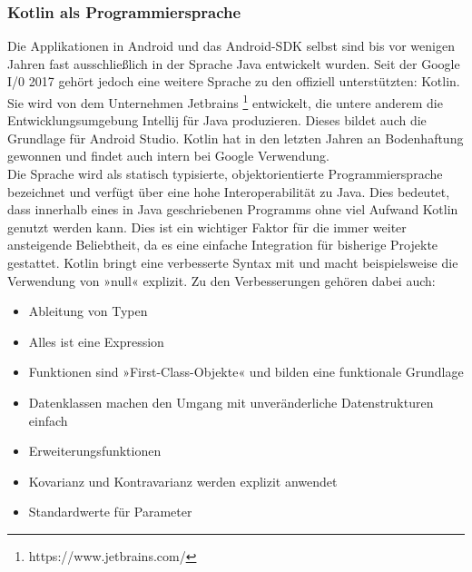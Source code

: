 \subsubsection{Kotlin als Programmiersprache}
Die Applikationen in Android und das Android-SDK selbst sind bis vor wenigen Jahren fast ausschließlich in der Sprache Java entwickelt wurden. Seit der Google I/0 2017 gehört jedoch eine weitere Sprache zu den offiziell unterstützten:  Kotlin. Sie wird von dem Unternehmen Jetbrains
\footnote{https://www.jetbrains.com/}
entwickelt, die untere anderem die Entwicklungsumgebung Intellij für Java produzieren. Dieses bildet auch die Grundlage für Android Studio.
Kotlin hat in den letzten Jahren an Bodenhaftung gewonnen und findet auch intern bei Google Verwendung.
\\
Die Sprache wird als statisch typisierte, objektorientierte Programmiersprache bezeichnet und verfügt über eine hohe Interoperabilität zu Java. Dies bedeutet, dass innerhalb eines in Java geschriebenen Programms ohne viel Aufwand Kotlin genutzt werden kann. Dies ist ein wichtiger Faktor für die immer weiter ansteigende Beliebtheit, da es eine einfache Integration für bisherige Projekte gestattet. 
Kotlin bringt eine verbesserte Syntax mit und macht beispielsweise die Verwendung von »null« explizit.
Zu den Verbesserungen gehören dabei auch:
\\
\begin{itemize}
	\item Ableitung von Typen
	\item Alles ist eine Expression 
	\item Funktionen sind »First-Class-Objekte« und bilden eine funktionale Grundlage
	\item Datenklassen machen den Umgang mit unveränderliche Datenstrukturen einfach
	\item Erweiterungsfunktionen
	\item Kovarianz und Kontravarianz werden explizit anwendet
	\item Standardwerte für Parameter
\end{itemize}
\bigskip
